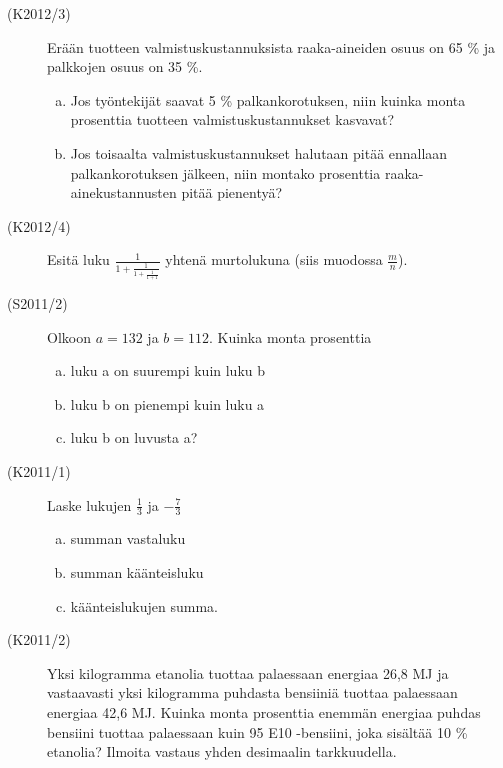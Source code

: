 \begin{description}
	\item[(K2012/3)] Erään tuotteen valmistuskustannuksista raaka-aineiden osuus on
        65 \% ja palkkojen osuus on 35 \%.
        
    	\begin{enumerate}[(a)]
    		\item Jos työntekijät saavat 5 \% palkankorotuksen, niin kuinka monta
                prosenttia tuotteen valmistuskustannukset kasvavat?
    		\item Jos toisaalta valmistuskustannukset halutaan pitää ennallaan
                palkankorotuksen jälkeen, niin montako prosenttia raaka-ainekustannusten
                pitää pienentyä?
    	\end{enumerate}	 

	\item[(K2012/4)] Esitä luku $\frac{1}{1+\frac{1}{1+\frac{1}{1+1}}}$ yhtenä murtolukuna (siis muodossa $\frac{m}{n}$).
	\item[(S2011/2)] Olkoon $a=132$ ja  $b=112$. Kuinka monta prosenttia 
		\begin{enumerate}[(a)]
			\item luku a on suurempi kuin luku b
			\item luku b on pienempi kuin luku a
			\item luku b on luvusta a? 
		\end{enumerate}
	\item[(K2011/1)] Laske lukujen $\frac{1}{3}$ ja $-\frac{7}{3}$
		\begin{enumerate}[(a)]
			\item summan vastaluku
			\item summan käänteisluku 
			\item käänteislukujen summa.
		\end{enumerate}
	\item[(K2011/2)] Yksi kilogramma etanolia tuottaa palaessaan energiaa 26,8 MJ
        ja vastaavasti yksi kilogramma puhdasta bensiiniä tuottaa palaessaan energiaa
        42,6 MJ. Kuinka monta prosenttia enemmän energiaa puhdas bensiini tuottaa
        palaessaan kuin 95 E10 -bensiini, joka sisältää 10 \% etanolia? Ilmoita
        vastaus yhden desimaalin tarkkuudella. 
\end{description}

